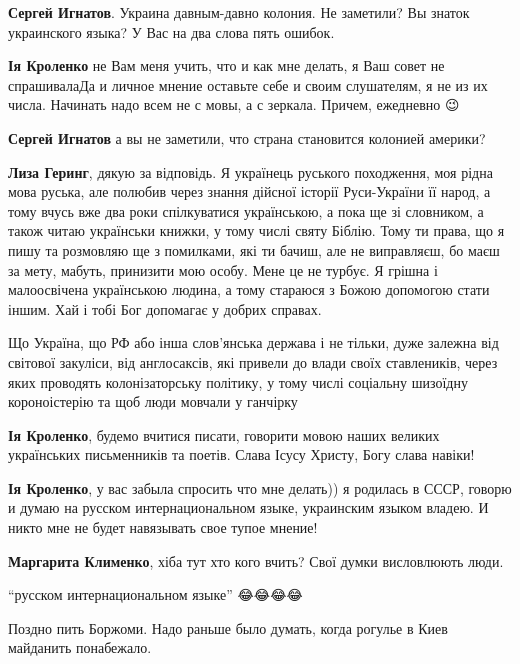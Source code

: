 \begin{itemize}
\textbf{Сергей Игнатов}. Украина давным-давно колония. Не заметили? Вы знаток украинского языка? У Вас на два слова пять ошибок.

\textbf{Ія Кроленко} не Вам меня учить, что и как мне делать, я Ваш совет не
спрашивала\Laughey[1.0] Да и личное мнение оставьте себе и своим слушателям, я не из их
числа. Начинать надо всем не с мовы, а с зеркала. Причем, ежедневно 😉

\textbf{Сергей Игнатов} а вы не заметили, что страна становится колонией америки?

\textbf{Лиза Геринг}, дякую за відповідь. Я українець руського походження, моя
рідна мова руська, але полюбив через знання дійсної історії Руси-України її
народ, а тому вчусь вже два роки спілкуватися українською, а пока ще зі
словником, а також читаю українськи книжки, у тому числі святу Біблію. Тому ти
права, що я пишу та розмовляю ще з помилками, які ти бачиш, але не виправляєш,
бо маєш за мету, мабуть, принизити мою особу. Мене це не турбує. Я грішна і
малоосвічена українською людина, а тому стараюся з Божою допомогою стати іншим.
Хай і тобі Бог допомагає у добрих справах.

Що Україна, що РФ або інша слов'янська держава і не тільки, дуже залежна від
світової закуліси, від англосаксів, які привели до влади своїх ставлеників,
через яких проводять колонізаторську політику, у тому числі соціальну шизоїдну
короноістерію та щоб люди мовчали у ганчірку

\textbf{Ія Кроленко}, будемо вчитися писати, говорити мовою наших великих
українських письменників та поетів. Слава Ісусу Христу, Богу слава навіки!

\textbf{Ія Кроленко}, у вас забыла спросить что мне делать)) я родилась в СССР,
говорю и думаю на русском интернациональном языке, украинским языком владею. И
никто мне не будет навязывать свое тупое мнение!

\textbf{Маргарита Клименко}, хіба тут хто кого вчить? Свої думки висловлюють люди.

\enquote{русском интернациональном языке} 😂😂😂😂

\end{itemize}

Поздно пить Боржоми. Надо раньше было думать, когда рогулье в Киев майданить понабежало.

